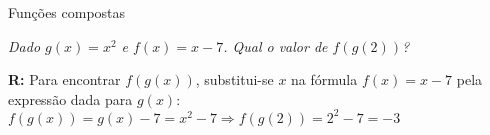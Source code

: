 \begin{frame}[allowframebreaks]{Funções compostas}
\begin{itemize}
    \skipframe

    \begin{ex}
        \emph{Dado $g(x) = x^2$ e $f(x) = x - 7$. Qual o valor de $f(g(2))$?} 

        \vspace{0.5cm}

        \textbf{R:} Para encontrar $f(g(x))$, substitui-se $x$ na fórmula $f(x) = x - 7$ pela expressão dada para $g(x)$: $f(g(x)) = g(x) - 7 = x^2 - 7 \Rightarrow f(g(2)) = 2^2 - 7 = -3$
        
    \end{ex}

    
\end{itemize}
    
\end{frame}